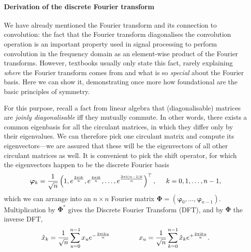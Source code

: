 \paragraph{Derivation of the discrete Fourier transform}
We have already mentioned the Fourier transform and its connection to convolution: the fact that the Fourier transform diagonalises the convolution operation is an important property used in signal processing to perform convolution in the frequency domain as an element-wise product of the Fourier transforms. 
%
However, textbooks usually only state this fact, rarely explaining {\em where} the Fourier transform comes from and what is so {\em special} about the Fourier basis. 
%
Here we can show it, demonstrating once more how foundational are the basic principles of symmetry. 


For this purpose, recall a fact from linear  algebra that (diagonalisable) matrices are {\em joinly diagonalisable} iff they mutually commute. 
%
In other words, there exists a common eigenbasis for all the circulant matrices, in which they differ only by their eigenvalues. 
%
We can therefore pick one circulant matrix and compute its eigenvectors---we are assured that these will be the eigenvectors of all other circulant matrices as well.
It is convenient to pick the shift operator, for which the eigenvectors happen to be the discrete Fourier basis 
$$
\boldsymbol{\varphi}_k = \frac{1}{\sqrt{n}}\left (1, e^{ \frac{2\pi \mathrm{i} k}{n}}, e^{ \frac{4\pi \mathrm{i} k}{n} }, \hdots , e^{ \frac{2\pi \mathrm{i}  (n-1)k}{n} }
\right)^\top, \hspace{5mm} k = 0, 1, \hdots, n-1,  
$$
%
which we can arrange into an $n\times n$ Fourier matrix $\boldsymbol{\Phi} = (\boldsymbol{\varphi}_0, \hdots, \boldsymbol{\varphi}_{n-1})$.
% 
%
Multiplication by $\boldsymbol{\Phi}^*$ 
gives the Discrete Fourier Transform (DFT), and by $\boldsymbol{\Phi}$ the inverse DFT, 
$$
\hat{x}_k = \frac{1}{\sqrt{n}}\sum_{u = 0}^{n-1}x_u e^{-\frac{2\pi \mi k u}{n} } \hspace{15mm}
%
{x}_u = \frac{1}{\sqrt{n}} \sum_{k = 0}^{n-1}\hat{x}_k e^{+\frac{2\pi \mi k u}{n} }.
$$

